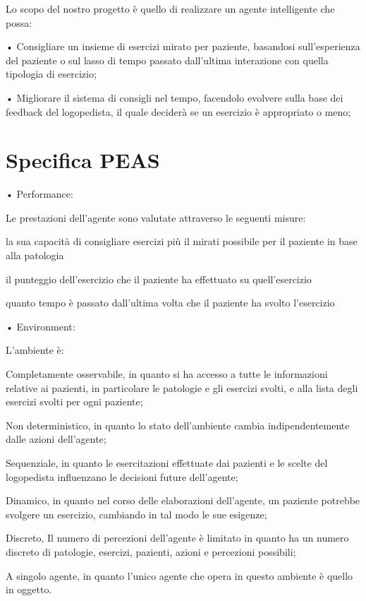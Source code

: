 \documentclass{article}
\begin{document}
    Lo scopo del nostro progetto è quello di realizzare un agente intelligente che possa:

    • Consigliare un insieme di esercizi mirato per paziente, basandosi sull'esperienza del paziente o sul lasso di tempo passato dall'ultima interazione con
    quella tipologia di esercizio;

    • Migliorare il sistema di consigli nel tempo, facendolo evolvere sulla base dei feedback del logopedista, il quale deciderà se un esercizio è appropriato
    o meno;

    \pagebreak
    \section{Specifica PEAS}

    • Performance:

    Le prestazioni dell’agente sono valutate attraverso le seguenti misure:

    la sua capacità di consigliare esercizi più il mirati possibile per il paziente in base alla patologia

    il punteggio dell'esercizio che il paziente ha effettuato su quell'esercizio

    quanto tempo è passato dall'ultima volta che il paziente ha svolto l'esercizio

    • Environment:

    L’ambiente è:

    Completamente osservabile, in quanto si ha accesso a tutte le informazioni relative ai pazienti, in particolare le patologie e gli esercizi svolti, e
    alla lista degli esercizi svolti per ogni paziente;

    Non deterministico, in quanto lo stato dell’ambiente cambia indipendentemente dalle azioni dell’agente;

    Sequenziale, in quanto le esercitazioni effettuate dai pazienti e le scelte del logopedista influenzano le decisioni future dell’agente;

    Dinamico, in quanto nel corso delle elaborazioni dell’agente, un paziente potrebbe svolgere un esercizio, cambiando in tal modo le sue esigenze;

    Discreto, Il numero di percezioni dell’agente è limitato in quanto ha un numero discreto di patologie, esercizi, pazienti, azioni e percezioni possibili;

    A singolo agente, in quanto l’unico agente che opera in questo ambiente è quello in oggetto.
\end{document}
